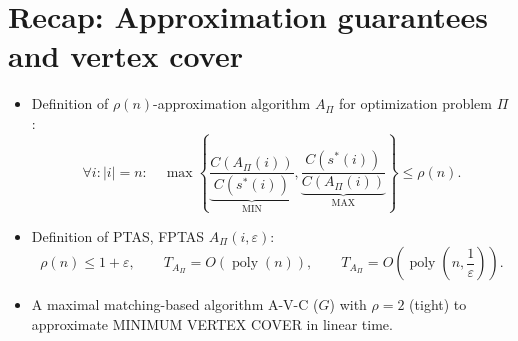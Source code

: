 \section{Recap: Approximation guarantees and vertex cover}
\begin{itemize}
\item Definition of $\rho(n)$-approximation algorithm $A_\Pi$ for optimization problem $\Pi$:
\[\forall i:|i|=n:\quad\max\left\{\underbrace{\frac{C(A_\Pi(i))}{C(s^*(i))}}_{\mathrm{MIN}},\underbrace{\frac{C(s^*(i))}{C(A_\Pi(i))}}_{\mathrm{MAX}}\right\}\leq\rho(n).\]
\item Definition of PTAS, FPTAS $A_\Pi(i,\varepsilon)$:
\[\rho(n)\leq1+\varepsilon,\qquad T_{A_\Pi}=O(\operatorname{poly}(n)),\qquad T_{A_\Pi}=O\left(\operatorname{poly}\left(n,\frac1\varepsilon\right)\right).\]
\item A maximal matching-based algorithm A-V-C ($G$) with $\rho=2$ (tight) to approximate MINIMUM VERTEX COVER in linear time.
\end{itemize}
